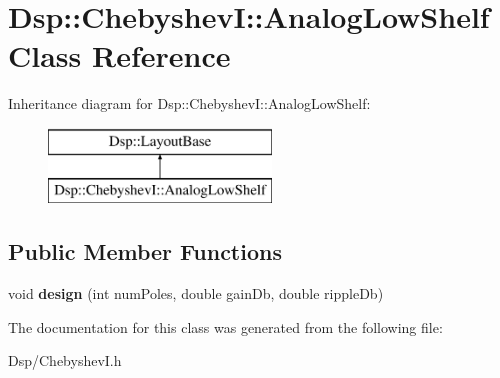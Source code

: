 \hypertarget{classDsp_1_1ChebyshevI_1_1AnalogLowShelf}{\section{Dsp\-:\-:Chebyshev\-I\-:\-:Analog\-Low\-Shelf Class Reference}
\label{classDsp_1_1ChebyshevI_1_1AnalogLowShelf}
}
Inheritance diagram for Dsp\-:\-:Chebyshev\-I\-:\-:Analog\-Low\-Shelf\-:\begin{figure}[H]
\begin{center}
\leavevmode
\includegraphics[height=2.000000cm]{classDsp_1_1ChebyshevI_1_1AnalogLowShelf}
\end{center}
\end{figure}
\subsection*{Public Member Functions}
\begin{DoxyCompactItemize}
\item 
\hypertarget{classDsp_1_1ChebyshevI_1_1AnalogLowShelf_a3dd94d55f2826f3655846e31929f5d90}{void {\bfseries design} (int num\-Poles, double gain\-Db, double ripple\-Db)}\label{classDsp_1_1ChebyshevI_1_1AnalogLowShelf_a3dd94d55f2826f3655846e31929f5d90}

\end{DoxyCompactItemize}


The documentation for this class was generated from the following file\-:\begin{DoxyCompactItemize}
\item 
Dsp/Chebyshev\-I.\-h\end{DoxyCompactItemize}
